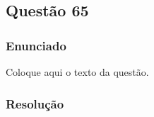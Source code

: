 \subsection{Questão 65}

\subsubsection{Enunciado}

Coloque aqui o texto da questão.

\vspace{0.5cm}

\subsubsection{Resolução}


\vspace{1cm}
